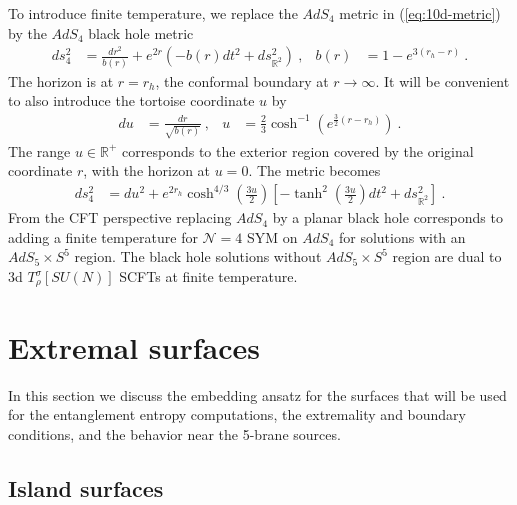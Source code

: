 \documentclass[aps,prd,11pt,notitlepage,longbibliography,nofootinbib,tightenlines,preprintnumbers]{revtex4-1}
\def\RR{{\mathds{R}}}
\begin{document}
To introduce finite temperature, we replace the $AdS_4$ metric in (\ref{eq:10d-metric}) by 
the $AdS_4$ black hole metric
\begin{align}\label{eq:ds2-AdS4-T}
	ds_4^2&=\frac{dr^2}{b(r)}+e^{2r}\left(-b(r)dt^2+ds^2_{\RR^2}\right)~,
	&
	b(r)&=1-e^{3(r_h-r)}~.
\end{align}
The horizon is at $r=r_h$, the conformal boundary at $r\rightarrow\infty$.
It will be convenient to also introduce the tortoise coordinate $u$ by
\begin{align}\label{eq:tortoise}
	du&=\frac{dr}{\sqrt{b(r)}}~, & u&=\frac{2}{3}\cosh^{-1}\left(e^{\frac{3}{2}(r-r_h)}\right)~.
\end{align}
The range $u\in\RR^+$ corresponds to the exterior region covered by the original coordinate $r$, with the horizon at $u=0$. The metric becomes
\begin{align}
	ds^2_4&=du^2+e^{2r_h}\cosh^{4/3}\left(\frac{3u}{2}\right)\left[-\tanh^2\left(\frac{3u}{2}\right)dt^2+ds^2_{\RR^2}\right]~.
\end{align}
From the CFT perspective replacing $AdS_4$ by a planar black hole corresponds to adding a finite temperature for $\mathcal N=4$ SYM on $AdS_4$ for solutions with an $AdS_5\times S^5$ region.
The black hole solutions without $AdS_5\times S^5$ region are dual to 3d $T_\rho^\sigma[SU(N)]$ SCFTs at finite temperature.



\section{Extremal surfaces}\label{sec:surfaces}

In this section we discuss the embedding ansatz for the surfaces that will be used for the entanglement entropy computations,
the extremality and boundary conditions, and the behavior near the 5-brane sources.


\subsection{Island surfaces}
\end{document}
